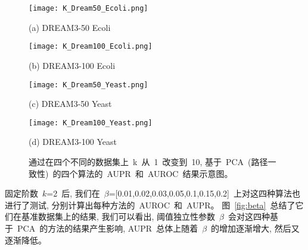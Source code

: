 \begin{figure*}[!htbp]
    \centering
    \begin{minipage}[b]{0.45\linewidth}
      \centering
      \centerline{
        \texttt{[image: K\_Dream50\_Ecoli.png]}}
      \centerline{(a) DREAM3-50 Ecoli}
      \medskip  
    \end{minipage}
    \begin{minipage}[b]{0.45\linewidth}
      \centering
      \centerline{
        \texttt{[image: K\_Dream100\_Ecoli.png]}}
      \centerline{(b) DREAM3-100 Ecoli}
      \medskip  
    \end{minipage}
      \begin{minipage}[b]{0.45\linewidth}
      \centering
      \centerline{
        \texttt{[image: K\_Dream50\_Yeast.png]}}
      \centerline{(c) DREAM3-50 Yeast}
      \medskip  
    \end{minipage}
    \begin{minipage}[b]{0.45\linewidth}
      \centering
      \centerline{
        \texttt{[image: K\_Dream100\_Yeast.png]}}
      \centerline{(d) DREAM3-100 Yeast}
      \medskip  
    \end{minipage}
    \caption{%
    通过在四个不同的数据集上~k~从~1~改变到~10, 基于~PCA~(路径一致性)~的四个算法的~AUPR~和~AUROC~结果示意图。
    }
    \label{fig:k}
    \vspace{-0.5em}
\end{figure*}

固定阶数~$k$=2~后, 我们在~$\beta$=[0.01,0.02,0.03,0.05,0.1,0.15,0.2]~上对这四种算法也进行了测试, 
分别计算出每种方法的~AUROC~和~AUPR。
图~\ref{fig:beta}~总结了它们在基准数据集上的结果, 
我们可以看出, 阈值独立性参数~$\beta$~会对这四种基于~PCA~的方法的结果产生影响,
AUPR~总体上随着~$\beta$~的增加逐渐增大, 然后又逐渐降低。

